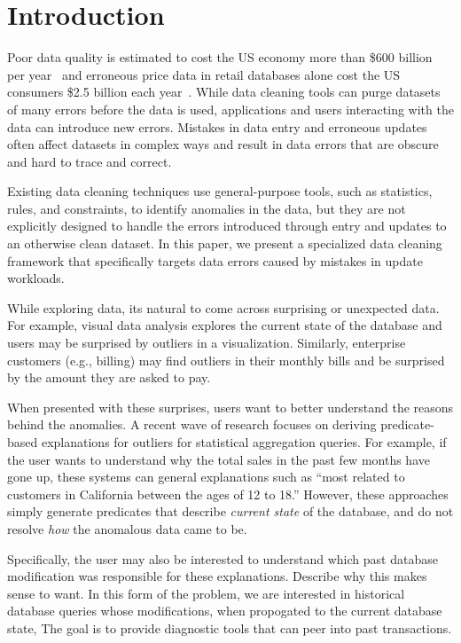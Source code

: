 
\section{Introduction}
\label{s:intro}

Poor data quality is estimated to cost the US economy more than \$600 billion
per year~\cite{eckerson2002} and erroneous price data in retail databases
alone cost the US consumers \$2.5 billion each year~\cite{Fan2008}. While data
cleaning tools can purge datasets of many errors before the data is used,
applications and users interacting with the data can introduce new errors.
Mistakes in data entry and erroneous updates often affect datasets in complex
ways and result in data errors that are obscure and hard to trace and correct.

Existing data cleaning techniques use general-purpose tools, such as
statistics, rules, and constraints, to identify anomalies in the data, but
they are not explicitly designed to handle the errors introduced through entry
and updates to an otherwise clean dataset.  In this paper, we present a specialized data
cleaning framework that specifically targets data errors caused by mistakes in
update workloads.

\xxx{====}

While exploring data, its natural to come across surprising or unexpected data.
For example, visual data analysis explores the current state of the database and users may be surprised by outliers in a visualization.
Similarly, enterprise customers (e.g., billing) may find outliers in their monthly bills and be surprised by the amount they are asked to pay.

When presented with these surprises, users want to better understand the reasons behind the anomalies.
A recent wave of research focuses on deriving predicate-based explanations for outliers for statistical aggregation queries.
For example, if the user wants to understand why the total sales in the past few months have gone up, these systems can general explanations such as ``most related to customers in California between the ages of 12 to 18.''
However, these approaches simply generate predicates that describe {\it current state} of the database, and do not resolve {\it how} the anomalous data came to be.

Specifically, the user may also be interested to understand which past database modification was responsible for these explanations.
Describe why this makes sense to want.  In this form of the problem, we are interested in historical database queries whose modifications, when propogated to the current database state, 
The goal is to provide diagnostic tools that can peer into past transactions.


